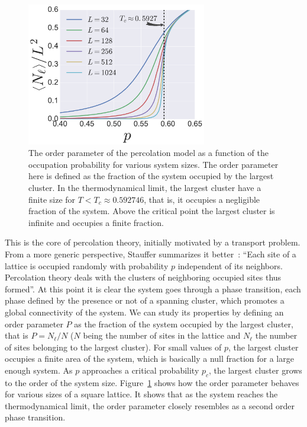 \begin{figure}[h]
\begin{center}
    \includegraphics[width=0.7\textwidth]{chapters/ch2-crit/figs/isoperco2}
\end{center}
\caption{The order parameter of the percolation model as a function of the
    occupation probability for various system sizes. The order parameter here
    is defined as the fraction of the system occupied by the largest cluster.
    In the thermodynamical limit, the largest cluster have a finite size for
    $T<T_c\approx 0.592746$, that is, it occupies a negligible fraction of the
    system. Above the critical point the largest cluster is infinite and occupies
    a finite fraction.}
\label{fig:isoperco2}
\end{figure}

This is the core of percolation theory, initially motivated by a transport
problem. From a more generic perspective, Stauffer summarizes it
better~\cite{Stauffer1994}: ``Each site of a lattice is occupied randomly with
probability $p$ independent of its neighbors. Percolation theory deals with the
clusters of neighboring occupied sites thus formed''. At this point it is clear
the system goes through a phase transition, each phase defined by the presence
or not of a spanning cluster, which promotes a global connectivity of the
system. We can study its properties by defining an order parameter $P$ as the
fraction of the system occupied by the largest cluster, that is $P=N_\ell/N$
($N$ being the number of sites in the lattice and $N_\ell$ the number of sites
belonging to the largest cluster). For small values of $p$, the largest cluster
occupies a finite area of the system, which is basically a null fraction for a
large enough system. As $p$ approaches a critical probability $p_c$, the
largest cluster grows to the order of the system size.
Figure~\ref{fig:isoperco2} shows how the order parameter behaves for various
sizes of a square lattice. It shows that as the system reaches the
thermodynamical limit, the order parameter closely resembles as a second order
phase transition.

